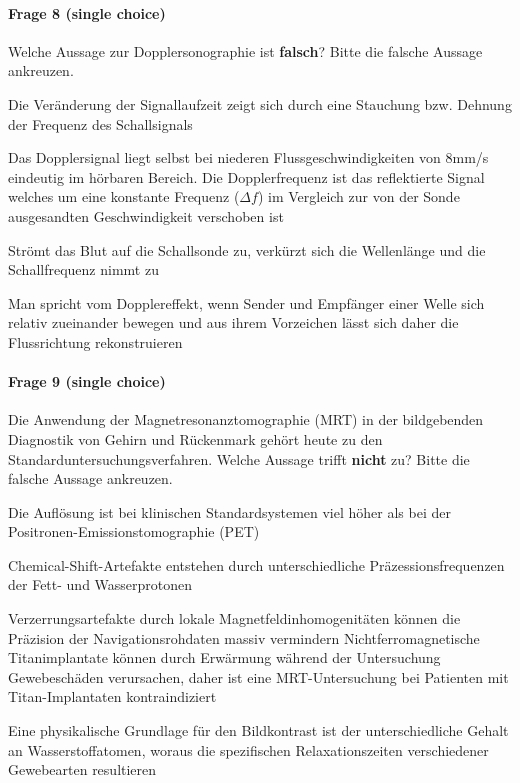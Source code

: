 \paragraph{Frage 8 (single choice)}

Welche Aussage zur Dopplersonographie ist \textbf{falsch}? Bitte die falsche Aussage ankreuzen.
\begin{benumerate}
  \item Die Veränderung der Signallaufzeit zeigt sich durch eine Stauchung bzw. Dehnung der Frequenz des Schallsignals
  \item Das Dopplersignal liegt selbst bei niederen Flussgeschwindigkeiten von 8mm/s eindeutig im hörbaren Bereich.
  \bolditem Die Dopplerfrequenz ist das reflektierte Signal welches um eine konstante Frequenz (\( \Delta f \)) im Vergleich zur von der Sonde ausgesandten Geschwindigkeit verschoben ist
  \item Strömt das Blut auf die Schallsonde zu, verkürzt sich die Wellenlänge und die Schallfrequenz nimmt zu
  \item Man spricht vom Dopplereffekt, wenn Sender und Empfänger einer Welle sich relativ zueinander bewegen und aus ihrem Vorzeichen lässt sich daher die Flussrichtung rekonstruieren
\end{benumerate}

\paragraph{Frage 9 (single choice)}

Die Anwendung der Magnetresonanztomographie (MRT) in der bildgebenden Diagnostik von Gehirn und Rückenmark gehört heute zu den Standarduntersuchungsverfahren. Welche Aussage trifft \textbf{nicht} zu? Bitte die falsche Aussage ankreuzen.
\begin{benumerate}
  \item Die Auflösung ist bei klinischen Standardsystemen viel höher als bei der Positronen-Emissionstomographie (PET)
  \item Chemical-Shift-Artefakte entstehen durch unterschiedliche Präzessionsfrequenzen der Fett- und Wasserprotonen
  \item Verzerrungsartefakte durch lokale Magnetfeldinhomogenitäten können die Präzision der Navigationsrohdaten massiv vermindern
  \bolditem Nichtferromagnetische Titanimplantate können durch Erwärmung während der Untersuchung Gewebeschäden verursachen, daher ist eine MRT-Untersuchung bei Patienten mit Titan-Implantaten kontraindiziert
  \item Eine physikalische Grundlage für den Bildkontrast ist der unterschiedliche Gehalt an Wasserstoffatomen, woraus die spezifischen Relaxationszeiten verschiedener Gewebearten resultieren
\end{benumerate}

